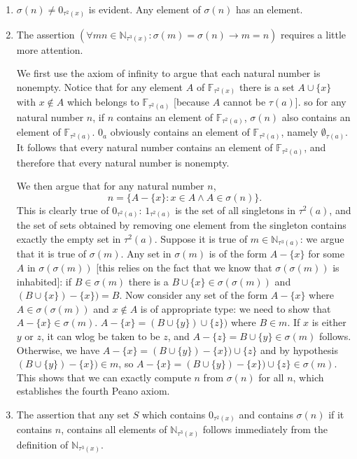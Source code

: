 \documentclass[12pt]{article}
\begin{document}
\begin{description}
\begin{enumerate}
\item  $\sigma(n) \neq 0_{\tau^2(x)}$ is evident.  Any element of $\sigma(n)$ has an element.

\item  The assertion $(\forall mn \in \mathbb N_{\tau^3(x)}:\sigma(m)=\sigma(n) \rightarrow m=n)$ requires a little more attention.

We first use the axiom of infinity to argue that each natural number is nonempty.  Notice that for any element $A$ of $\mathbb F_{\tau^2(x)}$ there is a set $A \cup \{x\}$ with $x \not\in A$ which belongs to $\mathbb F_{\tau^2(a)}$ [because $A$ cannot be $\tau(a)$]. so for any natural number $n$, if $n$ contains an element of $\mathbb F_{\tau^2(a)}$, $\sigma(n)$ also contains an element of $\mathbb F_{\tau^2(a)}$.  $0_a$ obviously contains an element of $\mathbb F_{\tau^2(a)}$, namely $\emptyset_{\tau(a)}$.  It follows that every natural number contains an element of $\mathbb F_{\tau^2(a)}$, and therefore that every natural number is nonempty.

We then argue that for any natural number $n$, $$n = \{A - \{x\}:x \in A \wedge A \in \sigma(n)\}.$$  This is clearly true of $0_{\tau^2(a)}$:  $1_{\tau^2(a)}$ is the set of all singletons in $\tau^2(a)$, and the set of sets obtained by removing one element from the singleton contains exactly the empty set in $\tau^2(a)$.  Suppose it is true of $m \in \mathbb N_{\tau^3(a)}$:  we argue that it is true of $\sigma(m)$.  Any set in $\sigma(m)$ is of the form $A - \{x\}$ for some $A$ in $\sigma(\sigma(m))$ [this relies on the fact that we know that $\sigma(\sigma(m))$ is inhabited]: if $B \in \sigma(m)$ there is a $B \cup \{x\} \in \sigma(\sigma(m))$ and
$(B \cup \{x\}) - \{x\}) = B$.  Now consider any set of the form $A -\{x\}$ where $A \in \sigma(\sigma(m))$ and $x \not\in A$ is of appropriate type:  we need to show that $A -\{x\}\in \sigma(m)$.  $A-\{x\} = (B \cup \{y\}) \cup \{z\})$ where $B \in m$.  If $x$ is either $y$ or $z$, it can wlog be taken to be $z$, and $A - \{z\} = B \cup \{y\} \in \sigma(m)$ follows.  Otherwise, we have $A - \{x\} = (B \cup \{y\}) - \{x\})\cup \{z\}$ and by hypothesis $(B \cup \{y\}) - \{x\})\in m$, so $A - \{x\} = (B \cup \{y\}) - \{x\})\cup \{z\}\in \sigma(m)$.  This shows that we can exactly compute $n$ from $\sigma(n)$ for all $n$, which establishes the fourth Peano axiom.

\item  The assertion that any set $S$ which contains $0_{\tau^2(x)}$ and contains $\sigma(n)$ if it contains $n$, contains all elements of $\mathbb N_{\tau^3(x)}$ follows immediately from the definition of $\mathbb N_{\tau^3(x)}$.





\end{enumerate}
\end{description}
\end{document}
